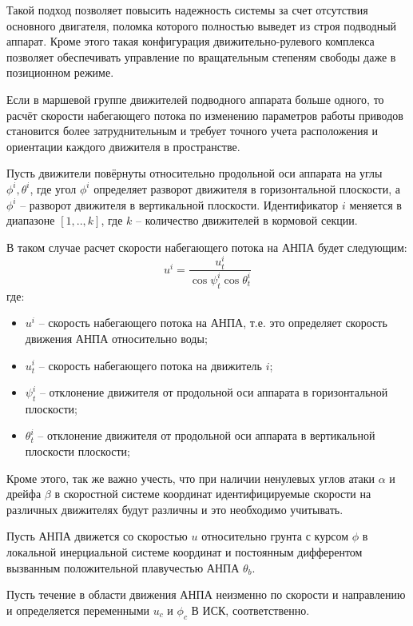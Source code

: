 Такой подход позволяет повысить надежность системы за счет отсутствия основного двигателя, поломка которого полностью выведет из строя подводный аппарат.
Кроме этого такая конфигурация движительно-рулевого комплекса позволяет обеспечивать управление по вращательным степеням свободы даже в позиционном режиме.

Если в маршевой группе движителей подводного аппарата больше одного, то расчёт скорости набегающего потока по изменению параметров работы приводов становится более затруднительным и требует точного учета расположения и ориентации каждого движителя в пространстве.

Пусть движители повёрнуты относительно продольной оси аппарата на углы $\phi^i, \theta^i$, где угол $\phi^i$ определяет разворот движителя в горизонтальной плоскости, а $\phi^i$ -- разворот движителя в вертикальной плоскости.
Идентификатор $i$ меняется в диапазоне $[1,..,k]$, где $k$ -- количество движителей в кормовой секции.

В таком случае расчет скорости набегающего потока на АНПА будет следующим:
\begin{equation}
    \label{eq:velocity_orientation}
    u^i = \frac{u^i_t}{\cos{\psi^i_t}\cos{\theta^i_t}}
\end{equation}
\noindent где:
\begin{itemize}
    \item $u^i$ -- скорость набегающего потока на АНПА, т.е. это определяет скорость движения АНПА относительно воды;
    \item $u^i_t$ -- скорость набегающего потока на движитель $i$;
    \item $\psi^i_t$ -- отклонение движителя от продольной оси аппарата в горизонтальной плоскости;
    \item $\theta^i_t$ -- отклонение движителя от продольной оси аппарата в вертикальной плоскости плоскости;
\end{itemize}

Кроме этого, так же важно учесть, что при наличии ненулевых углов атаки $\alpha$ и дрейфа $\beta$ в скоростной системе координат идентифицируемые скорости на различных движителях будут различны и это необходимо учитывать.

Пусть АНПА движется со скоростью $u$ относительно грунта с курсом $\phi$ в локальной инерциальной системе координат и постоянным дифферентом вызванным положительной плавучестью АНПА $\theta_b$.

Пусть течение в области движения АНПА неизменно по скорости и направлению и определяется переменными $u_c$ и $\phi_c$ В ИСК, соответственно.

